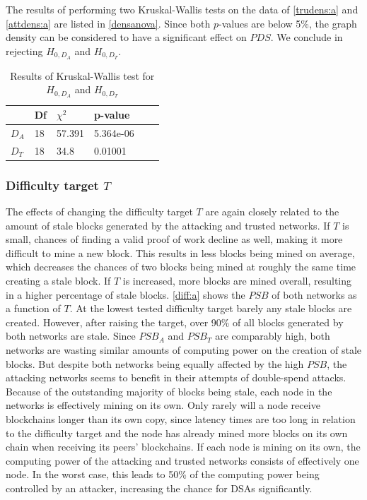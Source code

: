 \documentclass[a4paper,12pt,twoside]{report}
\begin{document}
The results of performing two Kruskal-Wallis tests on the data of \autoref{trudens:a} and \autoref{attdens:a} are listed in \autoref{densanova}. Since both $p$-values are below 5\%, the graph density can be considered to have a significant effect on $PDS$. We conclude in rejecting $H_{0,D_A}$ and $H_{0,D_T}$.
\begin{table}[h!]
\centering
\begin{tabular}{|l|l|l|l|l|l|} \hline
& Df & $\chi^{2}$ & p-value \\ \hline
$D_A$ & 18 &  57.391 & 5.364e-06 \\ \hline
$D_T$ & 18 & 34.8 & 0.01001 \\ \hline
\end{tabular}
\caption{Results of Kruskal-Wallis test for $H_{0,D_A}$ and $H_{0,D_T}$}
\label{densanova}
\end{table}

\subsubsection{Difficulty target $T$} \label{diffanalysis}
The effects of changing the difficulty target $T$ are again closely related to the amount of stale blocks generated by the attacking and trusted networks. If $T$ is small, chances of finding a valid proof of work decline as well, making it more difficult to mine a new block. This results in less blocks being mined on average, which decreases the chances of two blocks being mined at roughly the same time creating a stale block. If $T$ is increased, more blocks are mined overall, resulting in a higher percentage of stale blocks. \autoref{diff:a} shows the $PSB$ of both networks as a function of $T$. At the lowest tested difficulty target barely any stale blocks are created. However, after raising the target, over 90\% of all blocks generated by both networks are stale. Since $PSB_A$ and $PSB_T$ are comparably high, both networks are wasting similar amounts of computing power on the creation of stale blocks. But despite both networks being equally affected by the high $PSB$, the attacking networks seems to benefit in their attempts of double-spend attacks. Because of the outstanding majority of blocks being stale, each node in the networks is effectively mining on its own. Only rarely will a node receive blockchains longer than its own copy, since latency times are too long in relation to the difficulty target and the node has already mined more blocks on its own chain when receiving its peers' blockchains. If each node is mining on its own, the computing power of the attacking and trusted networks consists of effectively one node. In the worst case, this leads to 50\% of the computing power being controlled by an attacker, increasing the chance for DSAs significantly.
\end{document}
